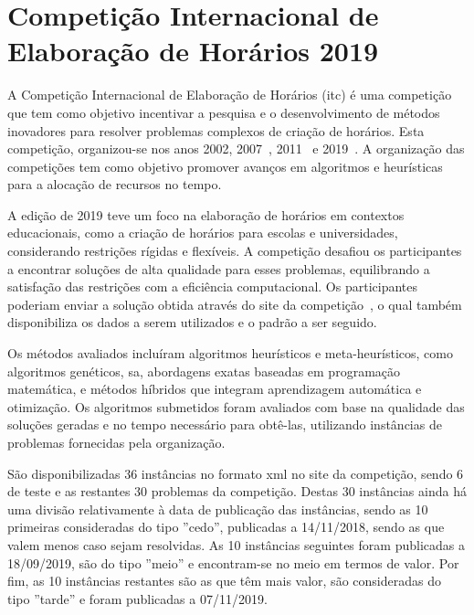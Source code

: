 



\section{Competição Internacional de Elaboração de Horários 2019}
\label{capitulo2:ITC-2019}

A Competição Internacional de Elaboração de Horários (\gls{itc}) é uma competição que tem como objetivo incentivar a pesquisa e o desenvolvimento de métodos inovadores para resolver problemas complexos de criação de horários. Esta competição, organizou-se nos anos 2002, 2007~\cite{SecondInternationalTimetabling-Mccollum-2007}, 2011~\cite{ThirdInternationalTimetabling-Post-2013} e 2019~\cite{Realworlduniversity-Mueller-2024}. A organização das competições tem como objetivo promover avanços em algoritmos e heurísticas para a alocação de recursos no tempo.

A edição de 2019 teve um foco na elaboração de horários em contextos educacionais, como a criação de horários para escolas e universidades, considerando restrições rígidas e flexíveis. A competição desafiou os participantes a encontrar soluções de alta qualidade para esses problemas, equilibrando a satisfação das restrições com a eficiência computacional. Os participantes poderiam enviar a solução obtida através do site da competição~\cite{itc2019-Website}, o qual também disponibiliza os dados a serem utilizados e o padrão a ser seguido.

Os métodos avaliados incluíram algoritmos heurísticos e meta-heurísticos, como algoritmos genéticos, \gls{sa}, abordagens exatas baseadas em programação matemática, e métodos híbridos que integram aprendizagem automática e otimização. Os algoritmos submetidos foram avaliados com base na qualidade das soluções geradas e no tempo necessário para obtê-las, utilizando instâncias de problemas fornecidas pela organização.

São disponibilizadas 36 instâncias no formato \gls{xml} no site da competição, sendo 6 de teste e as restantes 30 problemas da competição. Destas 30 instâncias ainda há uma divisão relativamente à data de publicação das instâncias, sendo as 10 primeiras consideradas do tipo ''cedo'', publicadas a 14/11/2018, sendo as que valem menos caso sejam resolvidas. As 10 instâncias seguintes foram publicadas a 18/09/2019, são do tipo ''meio'' e encontram-se no meio em termos de valor. Por fim, as 10 instâncias restantes são as que têm mais valor, são consideradas do tipo ''tarde'' e foram publicadas a 07/11/2019.

